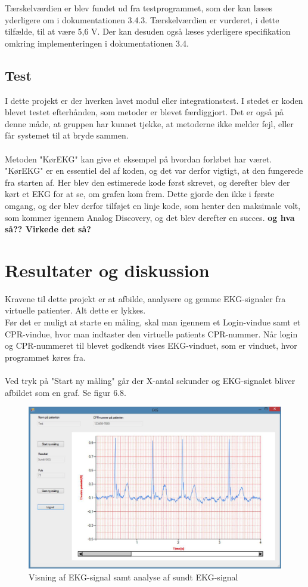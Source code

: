 Tærskelværdien er blev fundet ud fra testprogrammet, som der kan læses yderligere om i dokumentationen 3.4.3. Tærskelværdien er vurderet, i dette tilfælde, til at være 5,6 V. Der kan desuden også læses yderligere specifikation omkring implementeringen i dokumentationen 3.4. 


\subsection{Test}
I dette projekt er der hverken lavet modul eller integrationstest. I stedet er koden blevet testet efterhånden, som metoder er blevet færdiggjort. Det er også på denne måde, at gruppen har kunnet tjekke, at metoderne ikke melder fejl, eller får systemet til at bryde sammen. \\ \\
Metoden "KørEKG" kan give et eksempel på hvordan forløbet har været. "KørEKG" er en essentiel del af koden, og det var derfor vigtigt, at den fungerede fra starten af. Her blev den estimerede kode først skrevet, og derefter blev der kørt et EKG for at se, om grafen kom frem. Dette gjorde den ikke i første omgang, og der blev derfor tilføjet en linje kode, som henter den maksimale volt, som kommer igennem Analog Discovery, og det blev derefter en succes. \textbf{og hva så?? Virkede det så?}

\section{Resultater og diskussion}
Kravene til dette projekt er at afbilde, analysere og gemme EKG-signaler fra virtuelle patienter. Alt dette er lykkes. \\ 
Før det er muligt at starte en måling, skal man igennem et Login-vindue samt et CPR-vindue, hvor man indtaster den virtuelle patients CPR-nummer. Når login og CPR-nummeret til blevet godkendt vises EKG-vinduet, som er vinduet, hvor programmet køres fra. \\ \\
Ved tryk på "Start ny måling" går der X-antal sekunder og EKG-signalet bliver afbildet som en graf. Se figur 6.8. 

\begin{figure}[H]
	\centering
	\includegraphics[width=1\textwidth]{Figurer/Snip20150525_25}
	\caption{Visning af EKG-signal samt analyse af sundt EKG-signal}
\end{figure}

